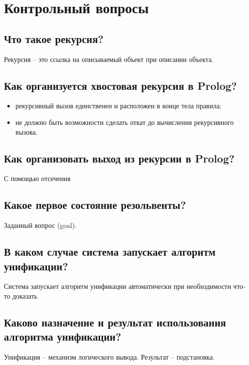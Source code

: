 \chapter{Контрольный вопросы}

\section{Что такое рекурсия?}

Рекурсия – это ссылка на описываемый объект при описании объекта.

\section{Как организуется хвостовая рекурсия в Prolog?}

\begin{itemize}
    \item рекурсивный вызов единственен и расположен в конце тела правила;
    \item не должно быть возможности сделать откат до вычисления рекурсивного вызова.
\end{itemize}

\section{Как организовать выход из рекурсии в Prolog?}

С помощью отсечения

\section{Какое первое состояние резольвенты?}

Заданный вопрос (goal).

\section{В каком случае система запускает алгоритм унификации?}

Система запускает алгоритм унификации автоматически при необходимости что-то доказать

\section{Каково назначение и результат использования алгоритма унификации?}

Унификация – механизм логического вывода. Результат – подстановка.

